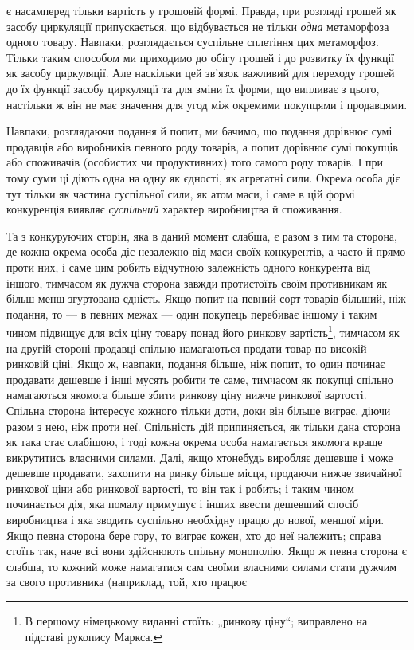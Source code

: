 \parcont{}  %
є насамперед тільки вартість у грошовій формі. Правда, при
розгляді грошей як засобу циркуляції припускається, що відбувається
не тільки \emph{одна} метаморфоза одного товару. Навпаки,
розглядається суспільне сплетіння цих метаморфоз. Тільки
таким способом ми приходимо до обігу грошей і до розвитку їх
функції як засобу циркуляції. Але наскільки цей зв’язок важливий
для переходу грошей до їх функції засобу циркуляції та
для зміни їх форми, що випливає з цього, настільки ж він не
має значення для угод між окремими покупцями і продавцями.

Навпаки, розглядаючи подання й попит, ми бачимо, що подання
дорівнює сумі продавців або виробників певного роду
товарів, а попит дорівнює сумі покупців або споживачів (особистих
чи продуктивних) того самого роду товарів. І при тому
суми ці діють одна на одну як єдності, як агрегатні сили. Окрема
особа діє тут тільки як частина суспільної сили, як атом маси,
і саме в цій формі конкуренція виявляє \emph{суспільний} характер
виробництва й споживання.

Та з конкуруючих сторін, яка в даний момент слабша, є разом
з тим та сторона, де кожна окрема особа діє незалежно від маси
своїх конкурентів, а часто й прямо проти них, і саме цим робить
відчутною залежність одного конкурента від іншого, тимчасом
як дужча сторона завжди протистоїть своїм противникам як
більш-менш згуртована єдність. Якщо попит на певний сорт
товарів більший, ніж подання, то — в певних межах — один покупець
перебиває іншому і таким чином підвищує для всіх ціну
товару понад його ринкову вартість\footnote*{
В першому німецькому виданні стоїть: „ринкову ціну“; виправлено на
підставі рукопису Маркса. 
}, тимчасом як на другій
стороні продавці спільно намагаються продати товар по високій
ринковій ціні. Якщо ж, навпаки, подання більше, ніж попит,
то один починає продавати дешевше і інші мусять робити те саме,
тимчасом як покупці спільно намагаються якомога більше збити
ринкову ціну нижче ринкової вартості. Спільна сторона інтересує
кожного тільки доти, доки він більше виграє, діючи разом з нею,
ніж проти неї. Спільність дій припиняється, як тільки дана сторона
як така стає слабішою, і тоді кожна окрема особа намагається
якомога краще викрутитись власними силами. Далі,
якщо хтонебудь виробляє дешевше і може дешевше продавати,
захопити на ринку більше місця, продаючи нижче звичайної
ринкової ціни або ринкової вартості, то він так і робить; і таким
чином починається дія, яка помалу примушує і інших ввести
дешевший спосіб виробництва і яка зводить суспільно необхідну
працю до нової, меншої міри. Якщо певна сторона бере гору,
то виграє кожен, хто до неї належить; справа стоїть так, наче
всі вони здійснюють спільну монополію. Якщо ж певна сторона
є слабша, то кожний може намагатися сам своїми власними силами
стати дужчим за свого противника (наприклад, той, хто працює
\parbreak{}  %
